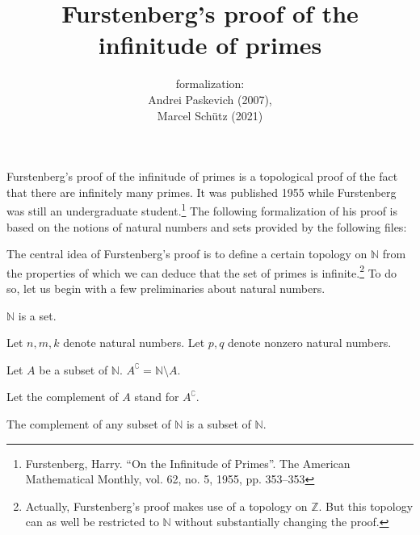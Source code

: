 \documentclass{article}
\title{Furstenberg's proof of the infinitude of primes}
\author{\Naproche formalization: \vspace{0.5em} \\
Andrei Paskevich (2007), \\
Marcel Schütz (2021)}
\date{}
\begin{document}
  \maketitle

  Furstenberg's proof of the infinitude of primes is a topological proof of the
  fact that there are infinitely many primes.
  It was published 1955 while Furstenberg was still an undergraduate
  student.\footnote{Furstenberg, Harry. \enquote{On the Infinitude of Primes}.
  The American Mathematical Monthly, vol. 62, no. 5, 1955, pp. 353–353}
  The following formalization of his proof is based on the notions of natural
  numbers and sets provided by the following files:

  \begin{forthel}
  \end{forthel}

  \begin{forthel}
  \end{forthel}

  \begin{forthel}
  \end{forthel}

  The central idea of Furstenberg's proof is to define a certain topology on
  $\mathbb{N}$ from the properties of which we can deduce that the set of
  primes is infinite.\footnote{Actually, Furstenberg's proof makes use of a
  topology on $\mathbb{Z}$. But this topology can as well be restricted to
  $\mathbb{N}$ without substantially changing the proof.}
  To do so, let us begin with a few preliminaries about natural numbers.

  \begin{forthel}
    \begin{axiom}
      $\mathbb{N}$ is a set.
    \end{axiom}

    Let $n,m,k$ denote natural numbers.
    Let $p,q$ denote nonzero natural numbers.

    \begin{definition}
      Let $A$ be a subset of $\mathbb{N}$.
      $A^{\complement} = \mathbb{N} \setminus A$.
    \end{definition}

    Let the complement of $A$ stand for $A^{\complement}$.

    \begin{lemma}
      The complement of any subset of $\mathbb{N}$ is a subset of $\mathbb{N}$.
    \end{lemma}
  \end{forthel}
\end{document}
